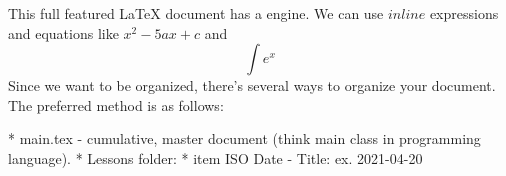 \markdownRendererUlBegin
\markdownRendererUlItem This full featured LaTeX document has a  engine.\markdownRendererUlItemEnd 
\markdownRendererUlItem We can use $inline$ expressions and equations like $x^2-5ax+c$ and $$\int e^x$$\markdownRendererUlItemEnd 
\markdownRendererUlEnd \markdownRendererInterblockSeparator
{}\markdownRendererInterblockSeparator
{}Since we want to be organized, there's several ways to organize your document. The preferred method is as follows:\markdownRendererInterblockSeparator
{}\markdownRendererInterblockSeparator
{}\begin{itemize} \end{itemize} * main.tex - cumulative, master document (think main class in programming language). * Lessons folder: * item ISO Date - Title: ex. 2021-04-20\relax